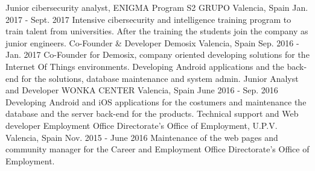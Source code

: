 \begin{cventries}
  \cventry
    {Junior cibersecurity analyst, ENIGMA Program}
    {S2 GRUPO}
    {Valencia, Spain}
    {Jan. 2017 - Sept. 2017}
    {
      Intensive cibersecurity and intelligence training program to train talent from universities. After the training the students join the company as junior engineers.
    }
  \cventry
    {Co-Founder & Developer}
    {Demosix}
    {Valencia, Spain}
    {Sep. 2016 - Jan. 2017}
    {
      Co-Founder for Demosix, company oriented developing solutions for the Internet Of Things environments. Developing Android applications and the back-end for the solutions, database maintenance and system admin.
    }
  \cventry
    {Junior Analyst and Developer}
    {WONKA CENTER}
    {Valencia, Spain}
    {June 2016 - Sep. 2016}
    {
      Developing Android and iOS applications for the costumers and maintenance the database and the server back-end for the products.
    }
  \cventry
    {Technical support and Web developer}
    {Employment Office Directorate’s Office of Employment, U.P.V.}
    {Valencia, Spain}
    {Nov. 2015 - June 2016}
    {
     Maintenance of the web pages and community manager for the Career and Employment Office Directorate’s Office of Employment.
    }
\end{cventries}
